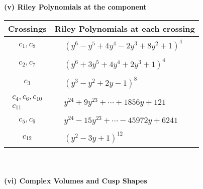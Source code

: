 \documentclass[1p]{elsarticle_modified}
\theoremstyle{definition}
\begin{document}
\flushleft \textbf{(v) Riley Polynomials at the component}\newline \\
\begin{tabular}{m{50pt}|m{274pt}}
Crossings & \hspace{64pt}Riley Polynomials at each crossing \\
\hline $$\begin{aligned}c_{1},c_{8}\end{aligned}$$&$\begin{aligned}
&(y^6- y^5+4 y^4-2 y^3+8 y^2+1)^4
\end{aligned}$\\
\hline $$\begin{aligned}c_{2},c_{7}\end{aligned}$$&$\begin{aligned}
&(y^6+3 y^5+4 y^4+2 y^3+1)^4
\end{aligned}$\\
\hline $$\begin{aligned}c_{3}\end{aligned}$$&$\begin{aligned}
&(y^3- y^2+2 y-1)^8
\end{aligned}$\\
\hline $$\begin{aligned}c_{4},c_{6},c_{10}\\c_{11}\end{aligned}$$&$\begin{aligned}
&y^{24}+9 y^{23}+\cdots+1856 y+121
\end{aligned}$\\
\hline $$\begin{aligned}c_{5},c_{9}\end{aligned}$$&$\begin{aligned}
&y^{24}-15 y^{23}+\cdots-45972 y+6241
\end{aligned}$\\
\hline $$\begin{aligned}c_{12}\end{aligned}$$&$\begin{aligned}
&(y^2-3 y+1)^{12}
\end{aligned}$\\
\hline
\end{tabular}\\~\\
\newpage\flushleft \textbf{(vi) Complex Volumes and Cusp Shapes}
\end{document}
